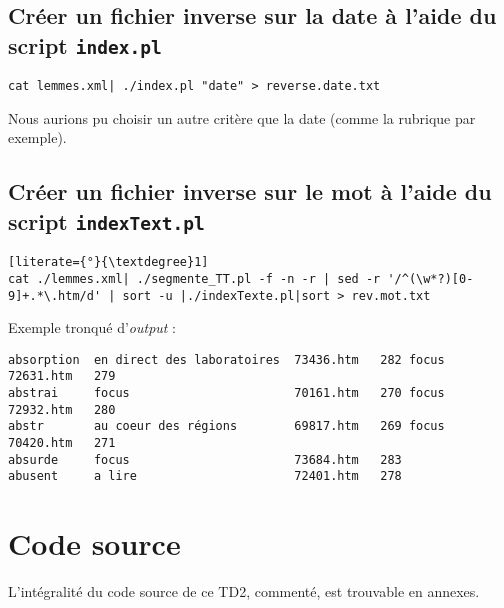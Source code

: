 \subsection{Créer un fichier inverse sur la date à l'aide du script \lstinline{index.pl}}

\fakeshell
\begin{lstlisting}
cat lemmes.xml| ./index.pl "date" > reverse.date.txt
\end{lstlisting}

Nous aurions pu choisir un autre critère que la date (comme la rubrique par exemple).

\subsection{Créer un fichier inverse sur le mot à l'aide du script \lstinline{indexText.pl}}

\begin{lstlisting}[literate={°}{\textdegree}1]
cat ./lemmes.xml| ./segmente_TT.pl -f -n -r | sed -r '/^(\w*?)[0-9]+.*\.htm/d' | sort -u |./indexTexte.pl|sort > rev.mot.txt
\end{lstlisting}

\noindent Exemple tronqué d'\textit{output} :
\begin{lstlisting}
absorption  en direct des laboratoires  73436.htm   282 focus   72631.htm   279
abstrai     focus                       70161.htm   270 focus   72932.htm   280
abstr       au coeur des régions        69817.htm   269 focus   70420.htm   271
absurde     focus                       73684.htm   283
abusent     a lire                      72401.htm   278
\end{lstlisting}

\section{Code source}

L'intégralité du code source de ce TD2, commenté, est trouvable en annexes.
